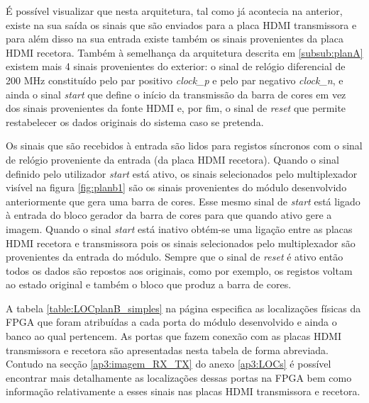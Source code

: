 É possível visualizar que nesta arquitetura, tal como já acontecia na anterior, existe na sua saída os sinais que são enviados para a placa HDMI transmissora e para além disso na sua entrada existe também os sinais provenientes da placa HDMI recetora. Também à semelhança da arquitetura descrita em \ref{subsub:planA} existem mais 4 sinais provenientes do exterior: o sinal de relógio diferencial de 200 MHz constituído pelo par positivo \textit{clock\_p} e pelo par negativo \textit{clock\_n}, e ainda o sinal \textit{start} que define o início da transmissão da barra de cores em vez dos sinais provenientes da fonte HDMI e, por fim, o sinal de \textit{reset} que permite restabelecer os dados originais do sistema caso se pretenda.

Os sinais que são recebidos à entrada são lidos para registos síncronos com o sinal de relógio proveniente da entrada (da placa HDMI recetora). Quando o sinal definido pelo utilizador \textit{start} está ativo, os sinais selecionados pelo multiplexador visível na figura \ref{fig:planb1} são os sinais provenientes do módulo desenvolvido anteriormente que gera uma barra de cores. Esse mesmo sinal de \textit{start} está ligado à entrada do bloco gerador da barra de cores para que quando ativo gere a imagem. Quando o sinal \textit{start} está inativo obtém-se uma ligação entre as placas HDMI recetora e transmissora pois os sinais selecionados pelo multiplexador são provenientes da entrada do módulo. Sempre que o sinal de \textit{reset} é ativo então todos os dados são repostos aos originais, como por exemplo, os registos voltam ao estado original e também o bloco que produz a barra de cores.

A tabela \ref{table:LOCplanB_simples} na página \pageref{table:LOCplanB_simples} especifica as localizações físicas da FPGA que foram atribuídas a cada porta do módulo desenvolvido e ainda o banco ao qual pertencem. As portas que fazem conexão com as placas HDMI transmissora e recetora são apresentadas nesta tabela de forma abreviada. Contudo na secção \ref{ap3:imagem_RX_TX} do anexo \ref{ap3:LOCs} é possível encontrar mais detalhamente as localizações dessas portas na FPGA bem como informação relativamente a esses sinais nas placas HDMI transmissora e recetora.

